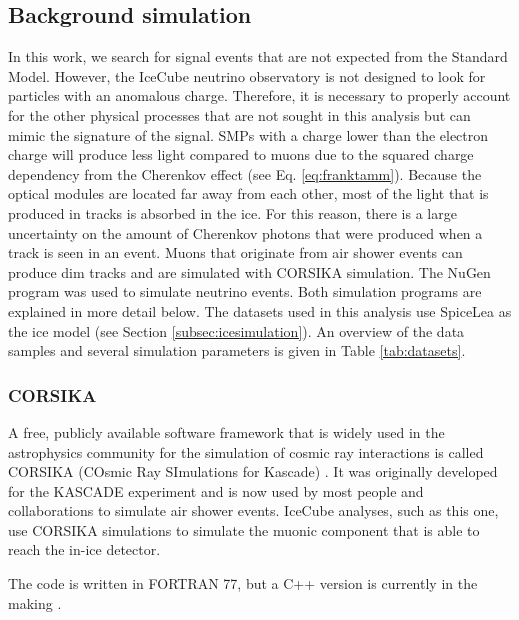 \subsection{Background simulation}
In this work, we search for signal events that are not expected from the Standard Model. However, the IceCube neutrino observatory is not designed to look for particles with an anomalous charge. Therefore, it is necessary to properly account for the other physical processes that are not sought in this analysis but can mimic the signature of the signal. SMPs with a charge lower than the electron charge will produce less light compared to muons due to the squared charge dependency from the Cherenkov effect (see Eq. \ref{eq:franktamm}). Because the optical modules are located far away from each other, most of the light that is produced in tracks is absorbed in the ice. For this reason, there is a large uncertainty on the amount of Cherenkov photons that were produced when a track is seen in an event. Muons that originate from air shower events can produce dim tracks and are simulated with CORSIKA simulation. The NuGen program was used to simulate neutrino events. Both simulation programs are explained in more detail below. The datasets used in this analysis use SpiceLea as the ice model (see Section \ref{subsec:icesimulation}). An overview of the data samples and several simulation parameters is given in Table \ref{tab:datasets}.

\subsubsection{CORSIKA}
\label{subsub:corsika}
A free, publicly available software framework that is widely used in the astrophysics community for the simulation of cosmic ray interactions is called CORSIKA  (COsmic Ray SImulations for Kascade) \cite{Heck:1998vt}. It was originally developed for the KASCADE experiment and is now used by most people and collaborations to simulate air shower events. IceCube analyses, such as this one, use CORSIKA simulations to simulate the muonic component that is able to reach the in-ice detector.

The code is written in FORTRAN 77, but a C++ version is currently in the making \cite{Engel:2018akg}.\\

